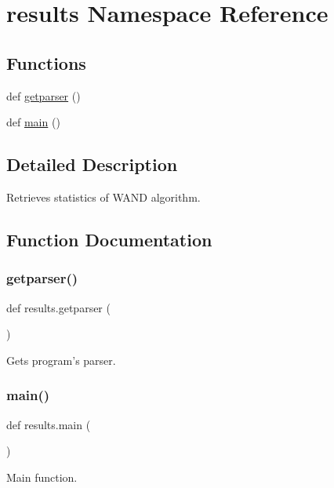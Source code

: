 \hypertarget{namespaceresults}{}\section{results Namespace Reference}
\label{namespaceresults}
\subsection*{Functions}
\begin{DoxyCompactItemize}
\item 
def \hyperlink{namespaceresults_af53f2dd617adc3354f4a3a74884fc0f4}{getparser} ()
\item 
def \hyperlink{namespaceresults_ad3d84ccbc1631cdb492e40a132665e47}{main} ()
\end{DoxyCompactItemize}


\subsection{Detailed Description}
\begin{DoxyVerb}Retrieves statistics of WAND algorithm.\end{DoxyVerb}
 

\subsection{Function Documentation}
\mbox{\label{namespaceresults_af53f2dd617adc3354f4a3a74884fc0f4}} 
\subsubsection{\texorpdfstring{getparser()}{getparser()}}
{\footnotesize\ttfamily def results.\+getparser (\begin{DoxyParamCaption}{ }\end{DoxyParamCaption})}

\begin{DoxyVerb}Gets program's parser.\end{DoxyVerb}
 \mbox{\label{namespaceresults_ad3d84ccbc1631cdb492e40a132665e47}} 
\subsubsection{\texorpdfstring{main()}{main()}}
{\footnotesize\ttfamily def results.\+main (\begin{DoxyParamCaption}{ }\end{DoxyParamCaption})}

\begin{DoxyVerb}Main function.\end{DoxyVerb}
 